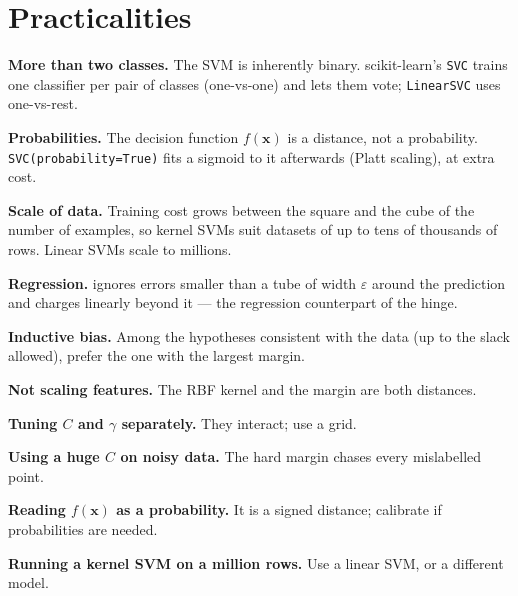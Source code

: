 \section{Practicalities}

\textbf{More than two classes.} The SVM is inherently binary. scikit-learn's
\texttt{SVC} trains one classifier per pair of classes (one-vs-one) and lets them
vote; \texttt{LinearSVC} uses one-vs-rest.

\textbf{Probabilities.} The decision function $f(\mathbf{x})$ is a distance, not a
probability. \texttt{SVC(probability=True)} fits a sigmoid to it afterwards
(Platt scaling), at extra cost.

\textbf{Scale of data.} Training cost grows between the square and the cube of the
number of examples, so kernel SVMs suit datasets of up to tens of thousands of
rows. Linear SVMs scale to millions.

\textbf{Regression.}  ignores errors smaller than a
tube of width $\varepsilon$ around the prediction and charges linearly beyond it ---
the regression counterpart of the hinge.

\textbf{Inductive bias.} Among the hypotheses consistent with the data (up to the
slack allowed), prefer the one with the largest margin.

\begin{pitfall}
\begin{tight}
  \item \textbf{Not scaling features.} The RBF kernel and the margin are both
        distances.
  \item \textbf{Tuning $C$ and $\gamma$ separately.} They interact; use a grid.
  \item \textbf{Using a huge $C$ on noisy data.} The hard margin chases every
        mislabelled point.
  \item \textbf{Reading $f(\mathbf{x})$ as a probability.} It is a signed distance;
        calibrate if probabilities are needed.
  \item \textbf{Running a kernel SVM on a million rows.} Use a linear SVM, or a
        different model.
\end{tight}
\end{pitfall}

